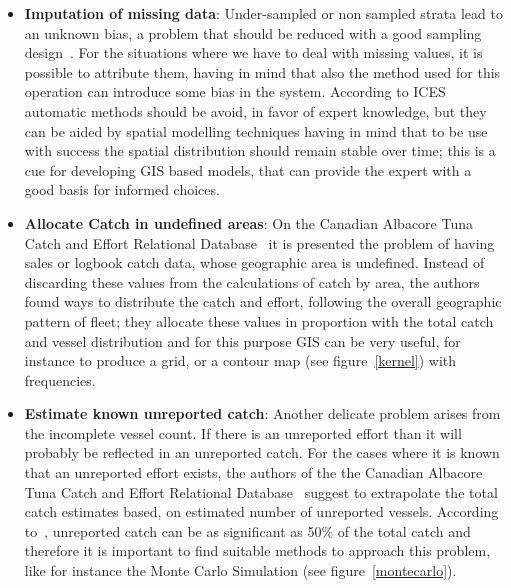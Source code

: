 \documentclass[11pt]{article} %
\begin{document}
\begin{itemize}
  \item \textbf{Imputation of missing data}: Under-sampled or non sampled strata lead to an unknown bias, a problem that should be reduced with a good sampling design~\cite{ices}. For the situations where we have to deal with missing values, it is possible to attribute them, having in mind that also the method used for this operation can introduce some bias in the system. According to ICES~\cite{ices} automatic methods should be avoid, in favor of expert knowledge, but they can be aided by spatial modelling techniques having in mind that to be use with success the spatial distribution should remain stable over time; this is a cue for developing GIS based models, that can provide the expert with a good basis for informed choices.

  \item \textbf{Allocate Catch in undefined areas}: On the Canadian Albacore Tuna Catch and Effort Relational Database~\cite{tuna} it is presented the problem of having sales or logbook catch data, whose geographic area is undefined. Instead of discarding these values from the calculations of catch by area, the authors found ways to distribute the catch and effort, following the overall geographic pattern of fleet; they allocate these values in proportion with the total catch and vessel distribution and for this purpose GIS can be very useful, for instance to produce a grid, or a contour map (see figure~\ref{kernel}) with frequencies.

  \item \textbf{Estimate known unreported catch}: Another delicate problem arises from the incomplete vessel count. If there is an unreported effort than it will probably be reflected in an unreported catch. For the cases where it is known that an unreported effort exists, the authors of the the Canadian Albacore Tuna Catch and Effort Relational Database~\cite{tuna} suggest to extrapolate the total catch estimates based, on estimated number of unreported vessels. According to~\cite{morocco}, unreported catch can be as significant as 50\% of the total catch and therefore it is important to find suitable methods to approach this problem, like for instance the Monte Carlo Simulation (see figure~\ref{montecarlo}).

\end{itemize}
\end{document}
